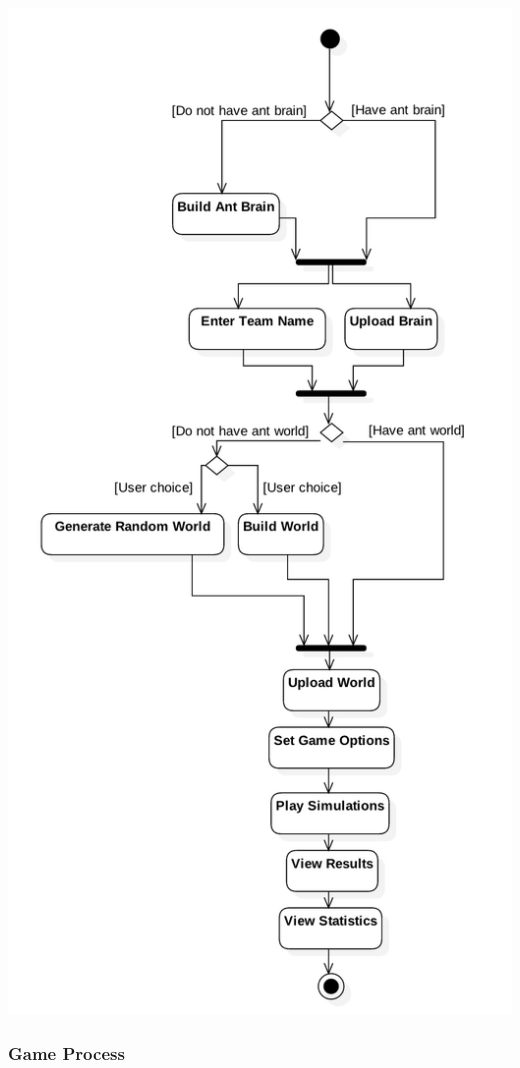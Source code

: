 \documentclass[11pt]{article}
\begin{document}
\begin{center}
\includegraphics[width=\textwidth,height=\textheight,keepaspectratio]{diagrams/process-model.png}
\end{center}

\subsubsection{Game Process}\label{game-process}
\end{document}
